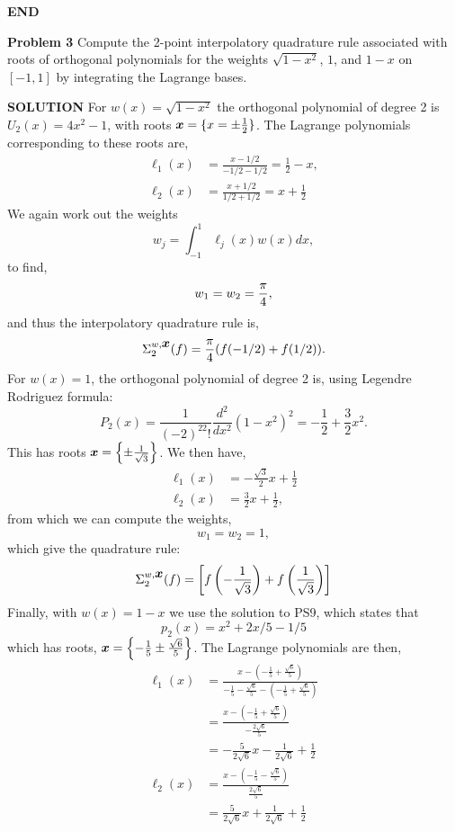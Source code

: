 \documentclass[12pt,a4paper]{article}
\def\x{ {\vc x} }
\begin{document}
\textbf{END}

\textbf{Problem 3} Compute the 2-point interpolatory quadrature rule associated with roots of orthogonal polynomials for the weights $\sqrt{1-x^2}$, $1$, and $1-x$ on $[-1,1]$ by integrating the Lagrange bases.

\textbf{SOLUTION} For $w(x) = \sqrt{1-x^2}$ the orthogonal polynomial of degree 2 is $U_2(x) = 4x^2 -1$, with roots $\ensuremath{\bm{\x}} = \{x = \ensuremath{\pm} \frac{1}{2}\}$. The Lagrange polynomials corresponding to these roots are,
\begin{align*}
\ensuremath{\ell}_1(x) &= \frac{x - 1/2}{-1/2 - 1/2} = \frac{1}{2} - x, \\
\ensuremath{\ell}_2(x) &= \frac{x + 1/2}{1/2 + 1/2} = x + \frac{1}{2}
\end{align*}
We again work out the weights
\[
w_j = \int_{-1}^1 \ensuremath{\ell}_j(x)w(x)dx,
\]
to find,
\[
w_1 = w_2 = {\ensuremath{\pi} \over 4},
\]
and thus the interpolatory quadrature rule is,
\[
\ensuremath{\Sigma}_2^{w,\ensuremath{\bm{\x}}}(f) = \frac{\ensuremath{\pi}}{4}(f(-1/2) + f(1/2)).
\]
For $w(x) = 1$, the orthogonal polynomial of degree 2 is, using Legendre Rodriguez formula:
\[
P_2(x) = \frac{1}{(-2)^22!} \frac{d^2}{dx^2}\left(1 - x^2\right)^2 = -\frac{1}{2} + \frac{3}{2}x^2.
\]
This has roots $\ensuremath{\bm{\x}} = \left\{\ensuremath{\pm} \frac{1}{\sqrt{3}}\right\}$. We then have,
\begin{align*}
	\ensuremath{\ell}_1(x) &= -\frac{\sqrt{3}}{2}x + \frac{1}{2} \\
	\ensuremath{\ell}_2(x) &= \frac{3}{2}x + \frac{1}{2},
\end{align*}
from which we can compute the weights,
\[
w_1 = w_2 = 1,
\]
which give the quadrature rule:
\[
\ensuremath{\Sigma}_2^{w,\ensuremath{\bm{\x}}}(f) = \left[f\left(-\frac{1}{\sqrt{3}}\right) + f\left(\frac{1}{\sqrt{3}}\right)\right]
\]
Finally, with $w(x) = 1 - x$ we use the solution to PS9, which states that
\[
p_2(x) = x^2 + 2x/5 - 1/5
\]
which has roots, $\ensuremath{\bm{\x}} = \left\{-\frac{1}{5} \ensuremath{\pm} \frac{\sqrt{6}}{5} \right\}$. The Lagrange polynomials are then,
\begin{align*}
	\ensuremath{\ell}_1(x) &= \frac{x - (-\frac{1}{5} + \frac{\sqrt{6}}{5} )}{-\frac{1}{5} - \frac{\sqrt{6}}{5} - (-\frac{1}{5} + \frac{\sqrt{6}}{5}) } \\
	&= \frac{x - (-\frac{1}{5} + \frac{\sqrt{6}}{5} )}{-\frac{2\sqrt{6}}{5}} \\
	&=-\frac{5}{2\sqrt{6}}x - \frac{1}{2\sqrt{6}} + \frac{1}{2} \\
	\ensuremath{\ell}_2(x) &= \frac{x - (-\frac{1}{5} - \frac{\sqrt{6}}{5} )}{\frac{2\sqrt{6}}{5}} \\
	&= \frac{5}{2\sqrt{6}}x + \frac{1}{2\sqrt{6}} + \frac{1}{2}
\end{align*}
\end{document}
